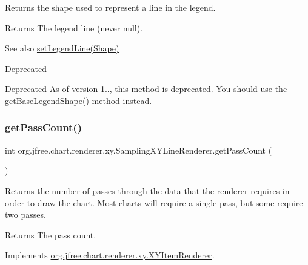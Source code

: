 Returns the shape used to represent a line in the legend.

\begin{DoxyReturn}{Returns}
The legend line (never {\ttfamily null}).
\end{DoxyReturn}
\begin{DoxySeeAlso}{See also}
\mbox{\hyperlink{classorg_1_1jfree_1_1chart_1_1renderer_1_1xy_1_1_sampling_x_y_line_renderer_a14fdb28396558b7d0c00cae5af9ea755}{set\+Legend\+Line(\+Shape)}}
\end{DoxySeeAlso}
\begin{DoxyRefDesc}{Deprecated}
\item[\mbox{\hyperlink{deprecated__deprecated000206}{Deprecated}}]As of version 1.., this method is deprecated. You should use the \mbox{\hyperlink{classorg_1_1jfree_1_1chart_1_1renderer_1_1_abstract_renderer_aa45bf25afaedd7148a78f4e4d29cf572}{get\+Base\+Legend\+Shape()}} method instead. \end{DoxyRefDesc}
\mbox{\label{classorg_1_1jfree_1_1chart_1_1renderer_1_1xy_1_1_sampling_x_y_line_renderer_a21ee33734eeee27f54d8cdb0b9c51e11}} 
\subsubsection{\texorpdfstring{get\+Pass\+Count()}{getPassCount()}}
{\footnotesize\ttfamily int org.\+jfree.\+chart.\+renderer.\+xy.\+Sampling\+X\+Y\+Line\+Renderer.\+get\+Pass\+Count (\begin{DoxyParamCaption}{ }\end{DoxyParamCaption})}

Returns the number of passes through the data that the renderer requires in order to draw the chart. Most charts will require a single pass, but some require two passes.

\begin{DoxyReturn}{Returns}
The pass count. 
\end{DoxyReturn}


Implements \mbox{\hyperlink{interfaceorg_1_1jfree_1_1chart_1_1renderer_1_1xy_1_1_x_y_item_renderer_afe42489776da2a4c7e64838382bbaea1}{org.\+jfree.\+chart.\+renderer.\+xy.\+X\+Y\+Item\+Renderer}}.

